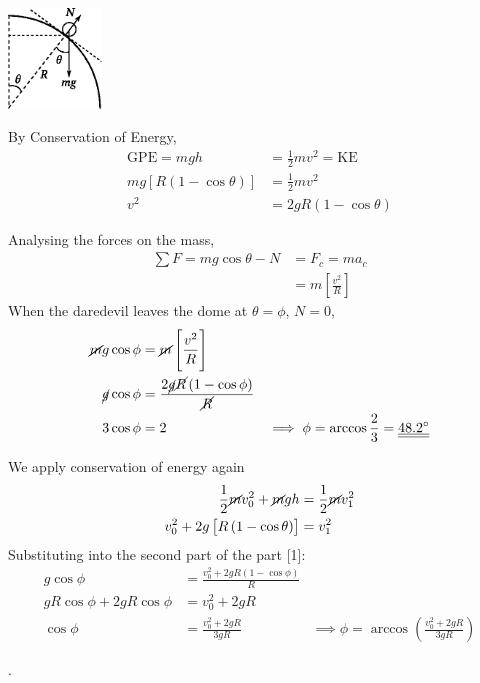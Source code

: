 \documentclass[answers]{exam}
\def\doubleunderline#1{\underline{\underline{#1}}}
\begin{document}
\begin{questions}
{\begin{solutionorbox}[115mm]
\begin{enumerate}[label={[\arabic*]}]
			\begin{minipage}{3cm} 
				\hspace{0.7cm}
				\includegraphics[width=2.5cm]{daredevil.eps}
			\end{minipage}
			\begin{minipage}{\linewidth - 3cm}
				By Conservation of Energy,
				\vspace{-0.3cm}
				\begin{align*}
				\text{GPE} = mgh &= \frac{1}{2}mv^2 = \text{KE} \\
				mg\left[R\left(1-\cos\theta\right)\right] &= \frac{1}{2}mv^2 \\
				v^2 &= 2gR\left(1-\cos\theta\right)
				\end{align*}
			\end{minipage}
		
			Analysing the forces on the mass,
			\begin{align*}
				\sum F = mg\cos\theta - N &= F_c = ma_c \\
				&= m\left[\frac{v^2}{R}\right]
			\end{align*}
			When the daredevil leaves the dome at $\theta = \phi$, $N = 0$,
			\begin{align*}
			 \cancel{m}g\cos\phi &= \cancel{m}\left[\frac{v^2}{R}\right] \\
			 \cancel{g}\cos\phi &= \frac{2\cancel{g}\cancel{R}\left(1-\cos\phi\right)}{\cancel{R}} \\
			 3\cos\phi &= 2 &\implies \phi = \arccos\frac{2}{3} = \doubleunderline{48.2\degree}
			\end{align*}
		\item We apply conservation of energy again
			\begin{align*}
				\frac{1}{2}\cancel{m}v_0^2 + \cancel{m}gh &= \frac{1}{2}\cancel{m}v_1^2 \\
				v_0^2 + 2g\left[R\left(1-\cos\theta\right)\right] &= v_1^2
			\end{align*}
			Substituting into the second part of the part [1]:
			\begin{align*}
				g\cos\phi &= \frac{v_0^2 + 2gR\left(1-\cos\phi\right)}{R} \\
				gR\cos\phi + 2gR\cos\phi &= v_0^2 + 2gR \\
				\cos\phi &= \frac{v_0^2 + 2gR}{3gR} &\implies \phi = \arccos \left(\frac{v_0^2 + 2gR}{3gR}\right)
			\end{align*}
		\item {\color{white} .}\vspace{-0.5cm}
		

\end{enumerate}
\end{solutionorbox}}
\end{questions}
\end{document}

